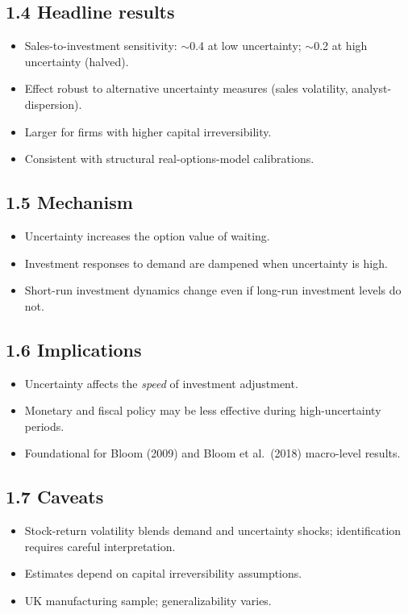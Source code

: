 \documentclass[11pt]{article}
\begin{document}
\subsection*{1.4 Headline results}
\begin{itemize}
\item Sales-to-investment sensitivity: $\sim$0.4 at low uncertainty; $\sim$0.2 at high uncertainty (halved).
\item Effect robust to alternative uncertainty measures (sales volatility, analyst-dispersion).
\item Larger for firms with higher capital irreversibility.
\item Consistent with structural real-options-model calibrations.
\end{itemize}

\subsection*{1.5 Mechanism}
\begin{itemize}
\item Uncertainty increases the option value of waiting.
\item Investment responses to demand are dampened when uncertainty is high.
\item Short-run investment dynamics change even if long-run investment levels do not.
\end{itemize}

\subsection*{1.6 Implications}
\begin{itemize}
\item Uncertainty affects the \emph{speed} of investment adjustment.
\item Monetary and fiscal policy may be less effective during high-uncertainty periods.
\item Foundational for Bloom (2009) and Bloom et al.\ (2018) macro-level results.
\end{itemize}

\subsection*{1.7 Caveats}
\begin{alertbox}
\begin{itemize}
\item Stock-return volatility blends demand and uncertainty shocks; identification requires careful interpretation.
\item Estimates depend on capital irreversibility assumptions.
\item UK manufacturing sample; generalizability varies.
\end{itemize}
\end{alertbox}
\end{document}
